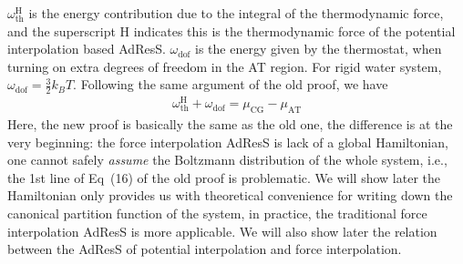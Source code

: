 \documentclass[aip,jcp,a4paper,reprint,onecolumn]{revtex4-1}
\newcommand{\redc}[1]{{\color{red} #1}}
\newcommand{\AT}{{\textrm{{AT}}}}
\newcommand{\CG}{{\textrm{CG}}}
\newcommand{\thf}{{\textrm{th}}}
\newcommand{\dof}{{\textrm{dof}}}
\newcommand{\hadress}{{\textrm{H}}}
\begin{document}
$\omega^\hadress_\thf$ is the energy contribution due to the integral
of the thermodynamic force,
and the superscript H indicates this is the thermodynamic force of the
potential interpolation based AdResS.  $\omega_\dof$ is the energy
given by the thermostat, when turning on extra degrees of freedom in
the AT region. For rigid water system, $\omega_\dof = \frac32
k_BT$. Following the same argument of the old proof, we have
\begin{align}\label{eqn:mueq-h}
  \omega^\hadress_\thf + \omega_\dof = \mu_\CG - \mu_\AT
\end{align}
\redc{Here, the new proof is basically the same as the old one, the
  difference is at the very beginning: the force interpolation
  AdResS is lack of a global
Hamiltonian, one cannot safely \emph{assume} the Boltzmann distribution
of the {whole} system, i.e., the 1st line of Eq~(16) of the old proof is
problematic.}
We will show
later the Hamiltonian only provides us with theoretical convenience
for writing down the canonical partition function of the system, in
practice, the traditional force interpolation AdResS is more
applicable. We will also show later the relation between the AdResS of
potential interpolation and force interpolation.
\\
\end{document}
